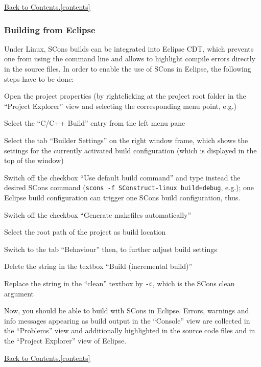 \documentclass[11pt, oneside]{scrartcl}
\newcommand{\backtocontents}{\hyperref[contents]{Back to Contents.\ref*{contents}}}
\begin{document}
\backtocontents
        
\subsubsection{Building from Eclipse}
      
Under Linux, SCons builds can be integrated into Eclipse CDT, which prevents one
from using the command line and allows to highlight compile errors directly in
the source files. In order to enable the use of SCons in Eclipse, the following
steps have to be done:
\begin{enumerate*}
\item Open the project properties (by rightclicking at the project root
folder in the ``Project Explorer'' view and selecting the corresponding
menu point, e.g.)
\item Select the ``C/C++ Build'' entry from the left menu pane
\item Select the tab ``Builder Settings'' on the right window frame, which shows
the settings for the currently activated build configuration (which is displayed
in the top of the window)
\item Switch off the checkbox ``Use default build command'' and type instead the
desired SCons command (\texttt{scons -f SConstruct-linux build=debug}, e.g.);
one Eclipse build configuration can trigger one SCons build configuration, thus. 
\item Switch off the checkbox ``Generate makefiles automatically''
\item Select the root path of the project as build location
\item Switch to the tab ``Behaviour'' then, to further adjust build settings
\item Delete the string in the textbox ``Build (incremental build)''
\item Replace the string in the ``clean'' textbox by \texttt{-c}, which is the
SCons clean argument
\end{enumerate*}
Now, you should be able to build with SCons in Eclipse. Errors, warnings and
info messages appearing as build output in the ``Console'' view are collected in
the ``Problems'' view and additionally highlighted in the source code files and
in the ``Project Explorer'' view of Eclipse.        
   
\backtocontents   
      
\end{document}
